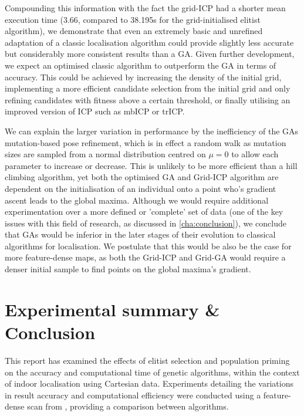 \documentclass[authoryearcitations]{UoYCSproject}
\begin{document}
Compounding this information with the fact the grid-ICP had a shorter mean execution time (3.66, compared to 38.195s for the grid-initialised elitist algorithm), we demonstrate that even an extremely basic and unrefined adaptation of a classic localisation algorithm could provide slightly less accurate but considerably more consistent results than a GA. Given further development, we expect an optimised classic algorithm to outperform the GA in terms of accuracy. This could be achieved by increasing the density of the initial grid, implementing a more efficient candidate selection from the initial grid and only refining candidates with fitness above a certain threshold, or finally utilising an improved version of ICP such as mbICP or trICP. \newline

We can explain the larger variation in performance by the inefficiency of the GAs mutation-based pose refinement, which is in effect a random walk as mutation sizes are sampled from a normal distribution centred on $\mu=0$ to allow each parameter to increase or decrease. This is unlikely to be more efficient than a hill climbing algorithm, yet both the optimised GA and Grid-ICP algorithm are dependent on the initialisation of an individual onto a point who's gradient ascent leads to the global maxima. Although we would require additional experimentation over a more defined or 'complete' set of data (one of the key issues with this field of research, as discussed in \autoref{cha:conclusion}), we conclude that GAs would be inferior in the later stages of their evolution to classical algorithms for localisation. We postulate that this would be also be the case for more feature-dense maps, as both the Grid-ICP and Grid-GA would require a denser initial sample to find points on the global maxima's gradient.

\chapter{Experimental summary \& Conclusion}
\label{cha:exp_summary}
This report has examined the effects of elitist selection and population priming on the accuracy and computational time of genetic algorithms, within the context of indoor localisation using Cartesian data. Experiments detailing the variations in result accuracy and computational efficiency were conducted using a feature-dense scan from \citet{Lenac2011-co}, providing a comparison between algorithms.
\end{document}
